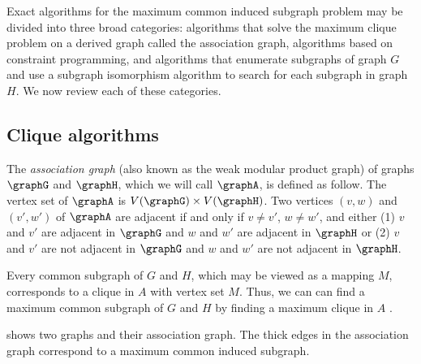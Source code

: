 Exact algorithms for the maximum common induced subgraph problem may be divided
into three broad categories: algorithms that solve the maximum clique problem
on a derived graph called the association graph, algorithms based on
constraint programming, and algorithms that enumerate subgraphs of graph $G$
and use a subgraph isomorphism algorithm to search for each subgraph in graph
$H$.  We now review each of these categories.

\subsection{Clique algorithms}

The \emph{association graph} (also known as the weak modular product graph)
of graphs $\graphG$ and $\graphH$, which we will call
$\graphA$, is defined as follow.  The vertex set of $\graphA$ is $V(\graphG)
\times V(\graphH)$.  Two vertices $(v,w)$ and $(v',w')$ of $\graphA$ are
adjacent if and only if $v \not= v'$, $w \not= w'$, and either (1) $v$ and $v'$
are adjacent in $\graphG$ and $w$ and $w'$ are adjacent in $\graphH$ or (2) $v$
and $v'$ are not adjacent in $\graphG$ and $w$ and $w'$ are not adjacent in
$\graphH$.

Every common subgraph of $G$ and $H$, which may be viewed as a mapping $M$,
corresponds to a clique in $A$ with vertex set $M$.  Thus, we can can find
a maximum common subgraph of $G$ and $H$ by finding a maximum clique in $A$
\citep{LeviG}.

 shows two graphs and their association graph.
The thick edges in the association graph correspond to a maximum common
induced subgraph.


